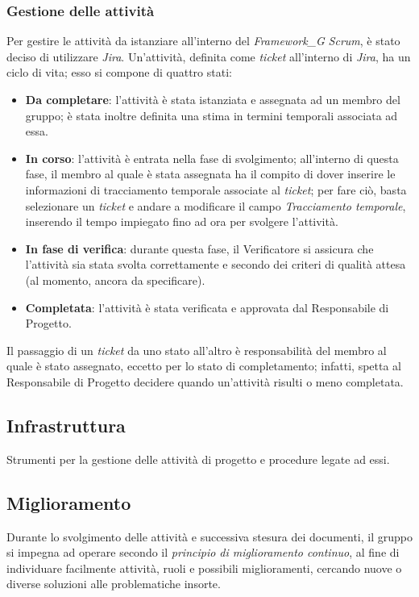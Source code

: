 \documentclass[12pt, oneside]{article}
\begin{document}
\subsubsection{Gestione delle attività}
Per gestire le attività da istanziare all'interno del \textit{Framework_G} \textit{Scrum}, è stato deciso di utilizzare \textit{Jira}. Un'attività, definita come \textit{ticket} all'interno di \textit{Jira}, ha un ciclo di vita; esso si compone di quattro stati:

\begin{itemize}
    \item \textbf{Da completare}: l'attività è stata istanziata e assegnata ad un membro del gruppo; è stata inoltre definita una stima in termini temporali associata ad essa.
    \item \textbf{In corso}: l'attività è entrata nella fase di svolgimento; all'interno di questa fase, il membro al quale è stata assegnata ha il compito di dover inserire le informazioni di tracciamento temporale associate al \textit{ticket}; per fare ciò, basta selezionare un \textit{ticket} e andare a modificare il campo \textit{Tracciamento temporale}, inserendo il tempo impiegato fino ad ora per svolgere l'attività.
    \item \textbf{In fase di verifica}: durante questa fase, il Verificatore si assicura che l'attività sia stata svolta correttamente e secondo dei criteri di qualità attesa (al momento, ancora da specificare).
    \item \textbf{Completata}: l'attività è stata verificata e approvata dal Responsabile di Progetto.
\end{itemize}
Il passaggio di un \textit{ticket} da uno stato all'altro è responsabilità del membro al quale è stato assegnato, eccetto per lo stato di completamento; infatti, spetta al Responsabile di Progetto decidere quando un'attività risulti o meno completata.

\subsection{Infrastruttura}
Strumenti per la gestione delle attività di progetto e procedure legate ad essi.
\subsection{Miglioramento}
Durante lo svolgimento delle attività e successiva stesura dei documenti, il gruppo si impegna ad operare secondo il \textit{principio di miglioramento continuo}, al fine di individuare facilmente attività, ruoli e possibili miglioramenti, cercando nuove o diverse soluzioni alle problematiche insorte.
\end{document}
